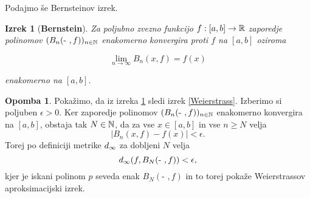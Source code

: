 \documentclass[a4paper, reqno]{amsart}
\theoremstyle{theorem}
\newtheorem{izrek}{Izrek}[section]
\theoremstyle{definition}
\newtheorem*{opomba*}{Opomba}
\begin{document}
Podajmo še Bernsteinov izrek.

\begin{izrek}[\textbf{Bernstein}]
	\label{Bernsteinov izrek}
	Za poljubno zvezno funkcijo $f:[a, b] \to \mathbb{R}$ zaporedje polinomov 
	$(B_n(\text{- },f))_{n \in \mathbb{N}}$ enakomerno konvergira
	proti $f$ na $[a, b]$ oziroma

	$$ \lim_{n\to\infty}B_n(x, f) = f(x)$$

	enakomerno na $[a,b]$.
\end{izrek}

\begin{opomba*}
	Pokažimo, da iz izreka \ref{Bernsteinov izrek} sledi izrek \ref{Weierstrass}.
	Izberimo si poljuben $\epsilon > 0$. Ker zaporedje polinomov 
	$(B_n(\text{- },f))_{n \in \mathbb{N}}$ enakomerno konvergira na $[a,b]$, obstaja tak 
	$N \in \mathbb{N}$, da za vse $x \in [a,b]$ in vse $n \geq N$ velja
	$$ |B_n(x,f) - f(x)| < \epsilon\text{.}$$
	Torej po definiciji metrike $d_{\infty}$ za dobljeni $N$ velja
	\begin{equation*}
		d_{\infty}(f, B_N(\text{- },f)) < \epsilon \text{,}
	\end{equation*}
	kjer je iskani polinom $p$ seveda enak $B_N(\text{- },f)$ in to torej pokaže 
	Weierstrassov aproksimacijski izrek.
\end{opomba*}
\end{document}
